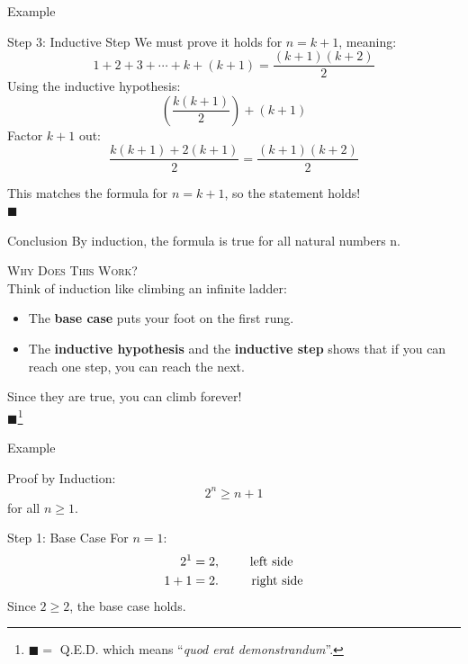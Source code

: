\documentclass{beamer}
\renewcommand{\qed}{\\ \hfill $\blacksquare$}
\begin{document}
\begin{frame}{Example}
    \begin{exampleblock}{Step 3: Inductive Step}
        We must prove it holds for $n = k + 1$, meaning:
        $$
            1 + 2 + 3 + \cdots + k + (k + 1) = \frac{(k + 1)(k + 2)}{2}
        $$ \pause
        Using the inductive hypothesis:
        $$
            \left( \frac{k (k + 1)}{2} \right) + (k + 1)
        $$ \pause
        Factor $k + 1$ out:
        $$
            \frac{k (k + 1) + 2(k + 1)}{2} = \frac{(k + 1)(k + 2)}{2}
        $$ \pause
    \end{exampleblock}
    This matches the formula for $n = k + 1$, so the statement holds!
    \qed
\end{frame}

\begin{frame}{Conclusion}
    By induction, the formula is true for all natural numbers n.\\
    \vspace{5mm}

    \textsc{Why Does This Work?}\\
    \vspace{2mm}
    Think of induction like climbing an infinite ladder:

    \begin{itemize}
        \item The \textbf{base case} puts your foot on the first rung.
        \item The \textbf{inductive hypothesis} and the \textbf{inductive step} shows that if you can reach one step, you can reach the next.
    \end{itemize}

    Since they are true, you can climb forever!
    \qed \footnote{$\blacksquare =$ Q.E.D. which means ``\textit{quod erat demonstrandum}''.}
\end{frame}


\begin{frame}{Example}
    \begin{exampleblock}{ }
        Proof by Induction:
        $$
            2^n \geq n + 1
        $$
        for all $n \geq 1$.
    \end{exampleblock}
\end{frame}

\begin{frame}{Step 1: Base Case}
    For $n = 1$:
    \begin{align*}
        2^1 &= 2,   \text{\hspace{7mm} left side} \\
        1 + 1 &= 2. \text{\hspace{8mm} right side}
    \end{align*}
    Since $2 \geq 2$, the base case holds. \checkmark
\end{frame}
\end{document}
